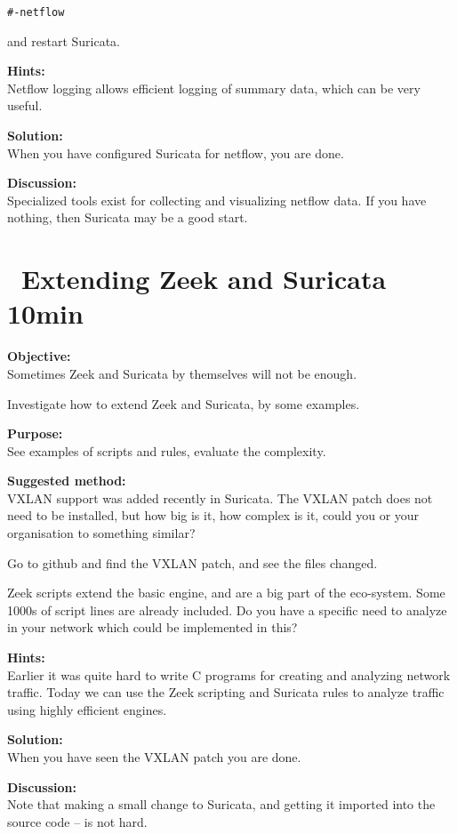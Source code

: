 \documentclass[a4paper,11pt,notitlepage]{report}
\begin{document}
\begin{alltt}
#- netflow
\end{alltt}

and restart Suricata.


{\bf Hints:}\\
Netflow logging allows efficient logging of summary data, which can be very useful.


{\bf Solution:}\\
When you have configured Suricata for netflow, you are done.


{\bf Discussion:}\\
Specialized tools exist for collecting and visualizing netflow data. If you have nothing, then Suricata may be a good start.


\chapter{\faInfoCircle\ Extending Zeek and Suricata 10min}
\label{ex:extended-zeek}


{\bf Objective:} \\
Sometimes Zeek and Suricata by themselves will not be enough.

Investigate how to extend Zeek and Suricata, by some examples.

{\bf Purpose:}\\
See examples of scripts and rules, evaluate the complexity.


{\bf Suggested method:}\\
VXLAN support was added recently in Suricata. The VXLAN patch does not need to be installed, but how big is it, how complex is it, could you or your organisation to something similar?

Go to github and find the VXLAN patch, and see the files changed.

Zeek scripts extend the basic engine, and are a big part of the eco-system. Some 1000s of script lines are already included. Do you have a specific need to analyze in your network which could be implemented in this?

{\bf Hints:}\\
Earlier it was quite hard to write C programs for creating and analyzing network traffic. Today we can use the Zeek scripting and Suricata rules to analyze traffic using highly efficient engines.


{\bf Solution:}\\
When you have seen the VXLAN patch you are done.

{\bf Discussion:}\\
Note that making a small change to Suricata, and getting it imported into the source code -- is not hard.
\end{document}
